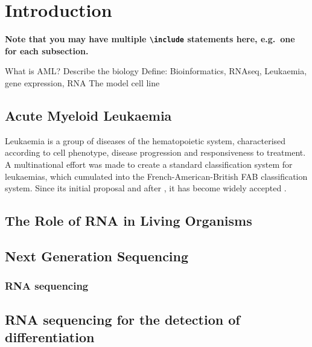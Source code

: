 \chapter{Introduction}

\textbf{Note that you may have multiple \texttt{{\textbackslash}include} statements here, e.g.\ one for each subsection.}

What is AML?
Describe the biology
Define: Bioinformatics, RNAseq, Leukaemia, gene expression, RNA
The model cell line


\section{Acute Myeloid Leukaemia}
Leukaemia is a group of diseases of the hematopoietic system, characterised according to cell phenotype, disease progression and responsiveness to treatment. A multinational effort was made to create a standard classification system for leukaemias, which cumulated into the French-American-British \ac{FAB} classification system. Since its initial proposal \citep{bennett1976proposals} and after , it has become widely accepted .


\section{The Role of RNA in Living Organisms}



\section{Next Generation Sequencing}

\subsection{RNA sequencing}



\section{RNA sequencing for the detection of differentiation}


